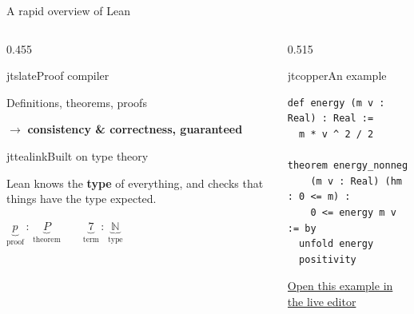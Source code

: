 \documentclass[aspectratio=169,10pt]{beamer}
\newcommand{\jtbody}{\small}
\begin{document}
\begin{frame}[fragile]{A rapid overview of Lean}
  \vfill
  \begin{columns}[T,onlytextwidth]

    \begin{column}{0.455\textwidth}
      \begin{jtblockcap}[top=4pt,bottom=3pt]{jtslate}{Proof compiler}
        {\jtbody\color{jtslate}Definitions, theorems, proofs\par
         \vspace{2pt}
         {\color{jtcopper}$\longrightarrow$}\;
         \textbf{consistency \& correctness, guaranteed}\par}
      \end{jtblockcap}

      \begin{jtblockcap}[top=4pt,bottom=3pt]{jttealink}{Built on type theory}
        {\jtbody\color{jtslate}Lean knows the \textbf{type} of everything, and
         checks that things have the type expected.\par}
        \vspace{1pt}
        {\centering\jtbody
          $\underbrace{p}_{\text{proof}}\,:\,\underbrace{P}_{\text{theorem}}
           \qquad
           \underbrace{7}_{\text{term}}\,:\,\underbrace{\mathbb{N}}_{\text{type}}$\par}
      \end{jtblockcap}
    \end{column}

    \begin{column}{0.515\textwidth}
      \begin{jtblockcap}[top=5pt,bottom=3pt]{jtcopper}{An example}
\begin{lstlisting}
def energy (m v : Real) : Real :=
  m * v ^ 2 / 2

theorem energy_nonneg
    (m v : Real) (hm : 0 <= m) :
    0 <= energy m v := by
  unfold energy
  positivity
\end{lstlisting}
      \end{jtblockcap}
      \vspace{1pt}
      {\fontsize{7.2}{8.6}\selectfont\color{jtgrey}%
        \href{https://live.lean-lang.org/\#codez=JYWwDg9gTgLgBAWQIYwBYBtgCMBQP0CmIIScwAdgMYTkDOwtMB5MA\%2BmgdEXABSkBccQCSEASl4AzOIMCohHEBJhHGljBkgLxwB6rAE84taFF15CxUgHcoNAObtUnKN0EAGOOoBMUrbv1RDcY0QkcNS\%2BBJRsHFwgvKRYwVLCyjFwANRwcWmUIgB6ACyuOHBFxUh5qellmXmFxUVpuQBUpQDMDRlwjS0NlDW19U1t2c3ljVhD3b3F\%2FUjdQyNts82TdXAAbE3ZboMeaeulW5Sb5etjB5vL5QCMW\%2FsLlFc3290PA1izHvxeNVAUVnjkNGo4AArjAkFhCHAACYESTMAhQKy6HjRABuCQASgQkOgklicZ4atEGnB0dk4B4APQUmo4SIOaLwxHaVgA8jkAhWXhozHY3G8VDRZxwAA86hAyhqLjFcCZSLgPM\%2B6W0NWB5HEEHQUNlHOZNUg9BgwFRwBg2iAA}%
          {\color{jtgrey}Open this example in the live editor}\par}
    \end{column}


\end{columns}
\end{frame}
\end{document}
